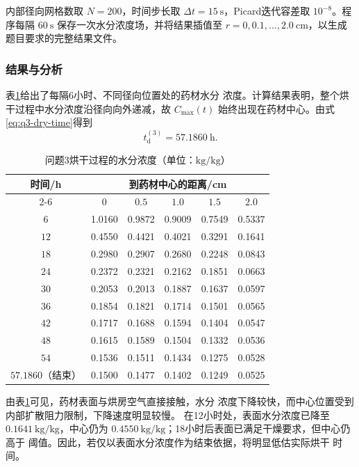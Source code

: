 \documentclass[12pt,a4paper]{article}
\renewcommand{\boxed}[1]{#1}
\begin{document}
内部径向网格数取 $N=200$，时间步长取
$\Delta t=15\ \mathrm{s}$，Picard迭代容差取 $10^{-8}$。程序每隔
$60\ \mathrm{s}$ 保存一次水分浓度场，并将结果插值至
$r=0,0.1,\ldots,2.0\ \mathrm{cm}$，以生成题目要求的完整结果文件。

\subsubsection{结果与分析}

表\ref{tab:q3-moisture}给出了每隔6小时、不同径向位置处的药材水分
浓度。计算结果表明，整个烘干过程中水分浓度沿径向向外递减，故
$C_{\max}(t)$ 始终出现在药材中心。由式\eqref{eq:q3-dry-time}得到
\begin{equation}
\boxed{t_{\mathrm d}^{(3)}=57.1860\ \mathrm{h}}.
\label{eq:q3-result-time}
\end{equation}

\begin{table}[H]
\centering
\caption{问题3烘干过程的水分浓度（单位：$\mathrm{kg/kg}$）}
\label{tab:q3-moisture}
\begin{tabular}{cccccc}
\toprule
\multirow{2}{*}{时间/h}
& \multicolumn{5}{c}{到药材中心的距离/cm}\\
\cmidrule(lr){2-6}
& $0$ & $0.5$ & $1.0$ & $1.5$ & $2.0$\\
\midrule
$6$  & 1.0160 & 0.9872 & 0.9009 & 0.7549 & 0.5337\\
$12$ & 0.4550 & 0.4421 & 0.4021 & 0.3291 & 0.1641\\
$18$ & 0.2980 & 0.2907 & 0.2680 & 0.2248 & 0.0843\\
$24$ & 0.2372 & 0.2321 & 0.2162 & 0.1851 & 0.0663\\
$30$ & 0.2053 & 0.2013 & 0.1887 & 0.1637 & 0.0597\\
$36$ & 0.1854 & 0.1821 & 0.1714 & 0.1501 & 0.0565\\
$42$ & 0.1717 & 0.1688 & 0.1594 & 0.1404 & 0.0547\\
$48$ & 0.1615 & 0.1589 & 0.1504 & 0.1332 & 0.0536\\
$54$ & 0.1536 & 0.1511 & 0.1434 & 0.1275 & 0.0528\\
$57.1860$（结束） & 0.1500 & 0.1477 & 0.1402 & 0.1249 & 0.0525\\
\bottomrule
\end{tabular}
\end{table}

由表\ref{tab:q3-moisture}可见，药材表面与烘房空气直接接触，水分
浓度下降较快，而中心位置受到内部扩散阻力限制，下降速度明显较慢。
在12小时处，表面水分浓度已降至 $0.1641\ \mathrm{kg/kg}$，中心仍为
$0.4550\ \mathrm{kg/kg}$；18小时后表面已满足干燥要求，但中心仍高于
阈值。因此，若仅以表面水分浓度作为结束依据，将明显低估实际烘干
时间。
\end{document}
